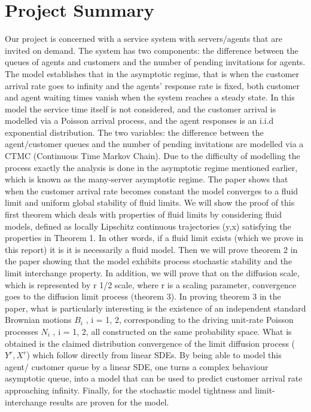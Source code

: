 	\section{Project Summary}
Our project is concerned with a service system with servers/agents that are invited on demand. The system has two components: the difference between the queues of agents and customers and the number of pending invitations for agents. The model establishes that in the asymptotic regime, that is when the customer arrival rate goes to infinity and the agents’ response rate is fixed, both customer and agent waiting times vanish when the system reaches a steady state. In this model the service time itself is not considered, and the customer arrival is modelled via a Poisson arrival process, and the agent responses is an i.i.d exponential distribution. The two variables: the difference between the agent/customer queues and the number of pending invitations are modelled via a CTMC (Continuous Time Markov Chain). Due to the difficulty of modelling the process exactly the analysis is done in the asymptotic regime mentioned earlier, which is known as the many-server asymptotic regime. \newline\newline
The paper shows that when the customer arrival rate becomes constant the model converges to a fluid limit and uniform global stability of fluid limits. We will show the proof of this first theorem which deals with properties of fluid limits by considering fluid models, defined as locally Lipschitz continuous trajectories (y,x) satisfying the properties in Theorem 1. In other words, if a fluid limit exists (which we prove in this report) it is it is necessarily a fluid model. Then we will prove theorem 2 in the paper showing that the model exhibits process stochastic stability and the limit interchange property. In addition, we will prove that on the diffusion scale, which is represented by r 1/2 scale, where r is a scaling parameter, convergence goes to the diffusion limit process (theorem 3). In proving theorem 3 in the paper, what is particularly interesting is the existence of an independent standard Brownian motions $B_i$ , i = 1, 2, corresponding to the driving unit-rate Poisson processes $N_i$ , i = 1, 2, all constructed on the same probability space. What is obtained is the claimed distribution convergence of the limit diffusion process ($Y^r , X^r$) which follow directly from linear SDEs. By being able to model this agent/ customer queue by  a linear SDE, one turns a complex behaviour asymptotic queue, into a model that can be used to predict customer arrival rate approaching infinity. Finally, for the stochastic model tightness and limit-interchange results are proven for the model. \newline\newline
